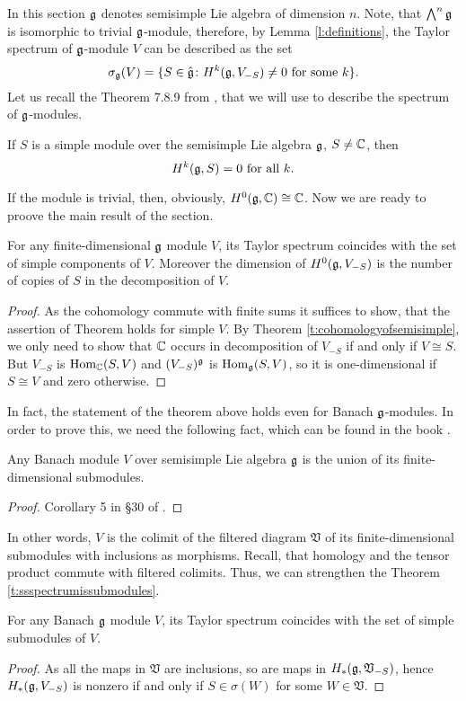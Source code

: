 In this section $\mathfrak{g}$ denotes semisimple Lie algebra of dimension $n$. Note, that $\bigwedge^n
\mathfrak{g}$ is isomorphic to trivial $\mathfrak{g}$-module, therefore, by Lemma \ref{l:definitions}, the Taylor
spectrum of $\mathfrak{g}$-module $V$ can be described as the set
\[
    \sigma_{\mathfrak{g}}(V) = \{ S \in \hat{\mathfrak{g}} \colon H^k(\mathfrak{g}, V_{-S})\neq 0 \text{ for some } k\}.
\]
Let us recall the Theorem 7.8.9 from \cite{weibel}, that we will use to describe the spectrum
of $\mathfrak{g}$-modules.
\begin{theorem} \label{t:cohomologyofsemisimple}
If $S$ is a simple module over the semisimple Lie algebra $\mathfrak{g}$, $S \neq \mathbb{C}$, then 
\[
    H^k(\mathfrak{g}, S) = 0 \text{ for all } k.
\]
\end{theorem}
If the module is trivial, then, obviously, $H^0(\mathfrak{g}, \mathbb{C}) \cong \mathbb{C}$. Now we are ready to proove
the main result of the section.
\begin{theorem} \label{t:ssspectrumissubmodules}
    For any finite-dimensional $\mathfrak{g}$ module $V$, its Taylor spectrum coincides with the set of
    simple components of $V$. Moreover the dimension of $H^0(\mathfrak{g}, V_{-S})$ is the number of copies
    of $S$ in the decomposition of $V$.
\end{theorem}
\begin{proof}
    As the cohomology commute with finite sums it suffices to show, that the assertion of Theorem holds for
    simple $V$. By Theorem \ref{t:cohomologyofsemisimple}, we only need to show that $\mathbb{C}$ occurs
    in decomposition of $V_{-S}$ if and only if $V\cong S$. But $V_{-S}$ is $\operatorname{Hom}_{\mathbb{C}}(S, V)$ and
    $(V_{-S})^{\mathfrak{g}}$ is $\operatorname{Hom}_{\mathfrak{g}}(S, V)$, so it is one-dimensional if $S\cong V$ and zero
    otherwise.
\end{proof}
In fact, the statement of the theorem above holds even for Banach $\mathfrak{g}$-modules. In order to
prove this, we need the following fact, which can be found in the book \cite{beltita}.

\begin{theorem}
    Any Banach module $V$ over semisimple Lie algebra $\mathfrak{g}$ is the union of its
    finite-dimensional submodules. 
\end{theorem}
\begin{proof}
    Corollary 5 in \S30 of \cite{beltita}.
\end{proof}
In other words, $V$ is the colimit of the filtered diagram $\mathfrak{V}$ of its finite-dimensional submodules
with inclusions as morphisms. Recall, that homology and the tensor product commute with filtered
colimits. Thus, we can strengthen the Theorem \ref{t:ssspectrumissubmodules}.
\begin{corollary}
    For any Banach $\mathfrak{g}$ module $V$, its Taylor spectrum coincides with the set of
    simple submodules of $V$. 
\end{corollary}
\begin{proof}
    As all the maps in $\mathfrak{V}$ are inclusions, so are maps in $H_*(\mathfrak{g}, \mathfrak{V}_{-S})$,
    hence $H_*(\mathfrak{g}, V_{-S})$ is nonzero if and only if $S \in \sigma(W)$ for some $W\in
    \mathfrak{V}$.
\end{proof}
